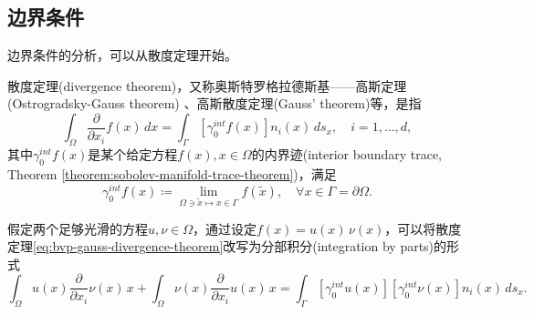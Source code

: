 \subsection{边界条件}

边界条件的分析，可以从散度定理开始。
\begin{theorem}[散度定理]
  \label{theorem:bvp-gauss-divergence-theorem}
  散度定理(divergence theorem)，又称奥斯特罗格拉德斯基——高斯定理(Ostrogradsky-Gauss theorem) 、高斯散度定理(Gauss' theorem)等，是指
  \begin{equation}
    \label{eq:bvp-gauss-divergence-theorem}
    \int_{\Omega} \frac{\partial}{\partial x_i} f(x) \, dx = \int_{\Gamma} \left[ \gamma_0^{int} f(x) \right] n_i(x) \, d s_x, \quad i = 1,\ldots,d,
  \end{equation}
  其中$\gamma_0^{int} f(x)$是某个给定方程$f(x), x\in \Omega$的内界迹(interior boundary trace, Theorem \ref{theorem:sobolev-manifold-trace-theorem})，满足
  \begin{equation}
    \label{eq:bvp-interior-boundary-trace}
    \gamma_0^{int} f(x) \coloneqq \lim_{\Omega \owns \tilde{x} \mapsto x \in \Gamma} f \left( \tilde{x} \right), \quad \forall x \in \Gamma = \partial \Omega.
  \end{equation}
\end{theorem}

假定两个足够光滑的方程$u,\nu \in \Omega$，通过设定$f(x) = u(x) \, \nu(x)$，可以将散度定理\eqref{eq:bvp-gauss-divergence-theorem}改写为分部积分(integration by parts)的形式
\begin{equation*}
  \int_{\Omega} u(x) \frac{\partial}{\partial x_i} \nu(x) \, x
  + \int_{\Omega} \nu(x) \frac{\partial}{\partial x_i} u(x) \, x
  = \int_{\Gamma}  \left[ \gamma_0^{int} u(x) \right] \left[ \gamma_0^{int} \nu(x) \right] n_i(x) \, d s_x.
\end{equation*}

